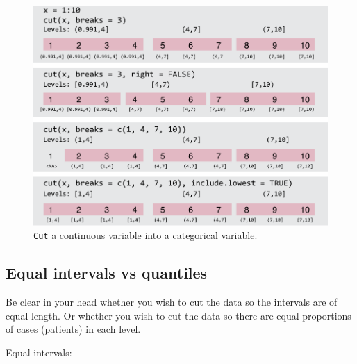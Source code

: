 \documentclass[
  12pt,
  krantz2]{krantz}
\makeatletter
\newenvironment{Shaded}{\begin{snugshade}}{\end{snugshade}}
\newcommand{\DataTypeTok}[1]{\textcolor[rgb]{0.13,0.29,0.53}{#1}}
\newcommand{\DecValTok}[1]{\textcolor[rgb]{0.00,0.00,0.81}{#1}}
\newcommand{\KeywordTok}[1]{\textcolor[rgb]{0.13,0.29,0.53}{\textbf{#1}}}
\newcommand{\NormalTok}[1]{#1}
\newcommand{\OperatorTok}[1]{\textcolor[rgb]{0.81,0.36,0.00}{\textbf{#1}}}
\newcommand{\StringTok}[1]{\textcolor[rgb]{0.31,0.60,0.02}{#1}}
\newenvironment{kframe}{%
\medskip{}
\setlength{\fboxsep}{.8em}
 \def\at@end@of@kframe{}%
 \ifinner\ifhmode%
  \def\at@end@of@kframe{\end{minipage}}%
  \begin{minipage}{\columnwidth}%
 \fi\fi%
 \def\FrameCommand##1{\hskip\@totalleftmargin \hskip-\fboxsep
 \colorbox{shadecolor}{##1}\hskip-\fboxsep
     \hskip-\linewidth \hskip-\@totalleftmargin \hskip\columnwidth}%
 \MakeFramed {\advance\hsize-\width
   \@totalleftmargin\z@ \linewidth\hsize
   \@setminipage}}%
 {\par\unskip\endMakeFramed%
 \at@end@of@kframe}
\renewenvironment{Shaded}{\begin{kframe}}{\end{kframe}}
\makeatother
\begin{document}
\begin{figure}
\centering
\includegraphics{images/chapter08/1_cut.pdf}
\caption{\label{fig:chap08-fig-cut}\texttt{Cut} a continuous variable into a categorical variable.}
\end{figure}

\hypertarget{equal-intervals-vs-quantiles}{%
\subsection{Equal intervals vs quantiles}\label{equal-intervals-vs-quantiles}}


Be clear in your head whether you wish to cut the data so the intervals are of equal length.
Or whether you wish to cut the data so there are equal proportions of cases (patients) in each level.

Equal intervals:

\begin{Shaded}
\end{Shaded}
\end{document}

